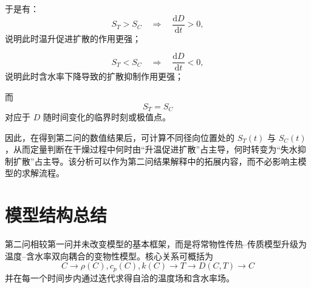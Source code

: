 \documentclass[UTF8,a4paper,12pt]{ctexart}
\begin{document}
于是有：
\[
S_T>S_C
\quad\Longrightarrow\quad
\frac{\mathrm{d}D}{\mathrm{d}t}>0,
\]
说明此时温升促进扩散的作用更强；

\[
S_T<S_C
\quad\Longrightarrow\quad
\frac{\mathrm{d}D}{\mathrm{d}t}<0,
\]
说明此时含水率下降导致的扩散抑制作用更强；

而
\begin{equation}
    S_T=S_C
    \label{eq:turning}
\end{equation}
对应于 $D$ 随时间变化的临界时刻或极值点。

因此，在得到第二问的数值结果后，可计算不同径向位置处的 $S_T(t)$ 与 $S_C(t)$，从而定量判断在干燥过程中何时由“升温促进扩散”占主导，何时转变为“失水抑制扩散”占主导。该分析可以作为第二问结果解释中的拓展内容，而不必影响主模型的求解流程。

\section{模型结构总结}

第二问相较第一问并未改变模型的基本框架，而是将常物性传热--传质模型升级为温度--含水率双向耦合的变物性模型。核心关系可概括为
\[
\boxed{
C
\rightarrow
\rho(C),c_p(C),k(C)
\rightarrow
T
\rightarrow
D(C,T)
\rightarrow
C
}
\]
并在每一个时间步内通过迭代求得自洽的温度场和含水率场。

\end{document}
